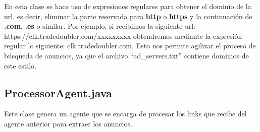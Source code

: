\documentclass{pre-tfg}
\begin{document}
En esta clase se hace uso de expresiones regulares para obtener el dominio de la url, es decir, eliminar
la parte reservada para \textbf{http} o \textbf{https} y la continuación de \textbf{.com}, \textbf{.es} o similar. Por ejemplo, si recibimos la siguiente url:
https://clk.tradedoubler.com/xxxxxxxxx obtendremos mediante la expresión regular lo siguiente:
clk.tradedoubler.com. Esto nos permite agilizar el proceso de búsqueda de anuncios, ya que el archivo ``ad\_servers.txt''
contiene dominios de este estilo.

\subsection{ProcessorAgent.java}

Este clase genera un agente que se encarga de procesar los links que recibe del agente anterior para extraer los anuncios.
\end{document}
